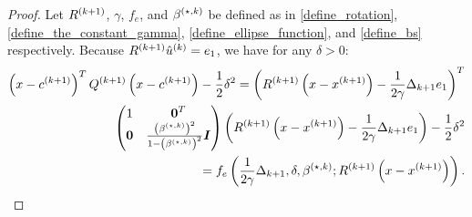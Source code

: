 \begin{proof}

Let ${R^{(k+1)}}$, $\gamma$, $f_e$, and ${\beta^{(\star, k)}}$ be defined as in \cref{define_rotation}, \cref{define_the_constant_gamma}, \cref{define_ellipse_function}, and \cref{define_bs} respectively.
Because ${R^{(k+1)}}{{\hat u}^{(k)}} = e_1$, we have for any $\delta > 0$:
\begin{align*}
\left(x - {c^{(k+1)}}\right)^T{Q^{(k+1)}}\left(x - {c^{(k+1)}}\right) - \frac 1 2 \delta^2 
= \left({R^{(k+1)}}\left(x-{{x}^{(k+1)}}\right) - \frac 1 {2\gamma} \Delta_{k+1} e_1\right)^T \\ \begin{pmatrix}
1 & \boldsymbol0^T \\
\boldsymbol 0 & \frac{\left({\beta^{(\star, k)}}\right)^2}{1 - \left({\beta^{(\star, k)}}\right)^2} \boldsymbol I \\
\end{pmatrix} \left({R^{(k+1)}}\left(x-{{x}^{(k+1)}}\right) - \frac 1 {2\gamma} \Delta_{k+1} e_1\right) - \frac 1 2 \delta^2 \\
= f_e\left(\frac 1 {2\gamma} \Delta_{k+1}, \delta, {\beta^{(\star, k)}}; {R^{(k+1)}}\left(x - {{x}^{(k+1)}}\right)\right).
\end{align*}




\end{proof}
